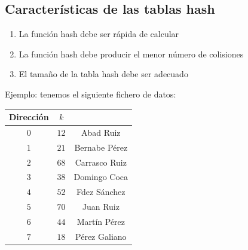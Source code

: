 \documentclass[10pt,a4paper,spanish]{report}
\begin{document}
\subsection{\textcolor[rgb]{0.3,0.4,0.8}Características de las tablas hash}

\begin{enumerate}[---]
      \item La función hash debe ser rápida de calcular
      \item La función hash debe producir el menor número de colisiones
      \item El tamaño de la tabla hash debe ser adecuado
\end{enumerate}

\noindent
\label{ejemplo_hash1}
Ejemplo: tenemos el siguiente fichero de datos:

\begin{center}
\begin{tabular}{| c | c | c |}
\hline
Dirección & $k$ & \\
\hline
$0$ & $12$ & Abad Ruiz \\
$1$ & $21$ & Bernabe Pérez \\
$2$ & $68$ & Carrasco Ruiz \\
$3$ & $38$ & Domingo Coca \\
$4$ & $52$ & Fdez Sánchez \\
$5$ & $70$ & Juan Ruiz \\
$6$ & $44$ & Martín Pérez \\
$7$ & $18$ & Pérez Galiano \\
\hline
\end{tabular}
\end{center}
\end{document}
